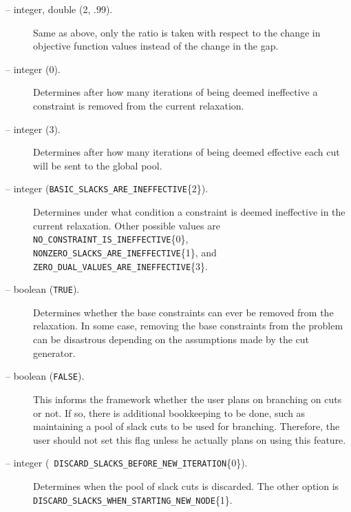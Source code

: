 \begin{description}
\item[ -- integer, double
(2, .99).] 
Same as above, only the ratio is taken with respect to the change in
objective function values instead of the change in the gap.

\item[ -- integer (0).]
Determines after how many iterations of being deemed ineffective a
constraint is removed from the current relaxation.

\item[ -- integer (3).] 
Determines after how many iterations of being deemed effective each
cut will be sent to the global pool.

\item[ -- integer
({\tt BASIC\_SLACKS\_ARE\_INEFFECTIVE}\{2\}).]
Determines under what condition a constraint is deemed ineffective in
the current relaxation. Other possible values are {\tt
NO\_CONSTRAINT\_IS\_INEFFECTIVE}\{0\},  {\tt
NONZERO\_SLACKS\_ARE\_INEFFECTIVE}\{1\}, and \\
{\tt ZERO\_DUAL\_VALUES\_ARE\_INEFFECTIVE}\{3\}.

\item[ -- boolean ({\tt TRUE}).]
Determines whether the base constraints can ever be removed from the
relaxation. In some case, removing the base constraints from the
problem can be disastrous depending on the assumptions made by the cut
generator.

\item[ -- boolean ({\tt FALSE}).]
This informs the framework whether the user plans on branching on cuts
or not. If so, there is additional bookkeeping to be done, such as
maintaining a pool of slack cuts to be used for branching. Therefore,
the user should not set this flag unless he actually plans on using
this feature.

\item[ -- integer ({\tt
DISCARD\_SLACKS\_BEFORE\_NEW\_ITERATION}\{0\}).]
Determines when the pool of slack cuts is discarded. The other option
is {\tt DISCARD\_SLACKS\_WHEN\_STARTING\_NEW\_NODE}\{1\}.



\end{description}
